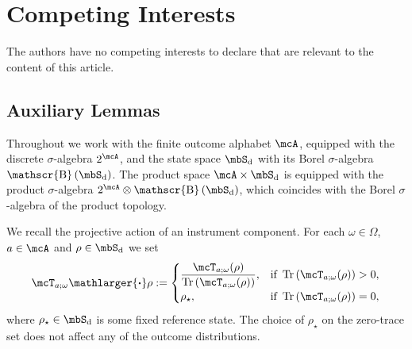 \documentclass[a4paper]{article}
\numberwithin{equation}{section}   %
\theoremstyle{plain}   %
\theoremstyle{plain}   %
\theoremstyle{examplestyle}
\DeclareMathOperator{\states}{\mbS_d}   %
\DeclareMathOperator{\dummyborel}{\mathscr{B}}                  %
\newcommand\borel[1]{\dummyborel\left(#1\right)}    %
\renewcommand{\tr}[1]{\operatorname{Tr}\left(#1\right)} %
\newcommand{\proj}{{\mathlarger{\boldsymbol{\cdot}}}} %
\begin{document}
\section*{Competing Interests}
\noindent
The authors have no competing interests to declare that are relevant to the content of this article. 
\begin{appendix}


\section{Auxiliary Lemmas}
\label{section:appn}


    Throughout we work with the finite outcome alphabet $\mcA$, equipped with the discrete $\sigma$-algebra $2^\mcA$, and the state space $\states$ with its Borel $\sigma$-algebra $\borel{\states}$.
    The product space $\mcA\times\states$ is equipped with the product $\sigma$-algebra $2^\mcA\otimes\borel{\states}$, which coincides with the Borel $\sigma$-algebra of the product topology.

    We recall the projective action of an instrument component.
    For each $\omega\in\Omega$, $a\in\mcA$ and $\rho\in\states$ we set
    \begin{equation}
    \label{eq:appendix-projective-action}
        \mcT_{a;\omega}\proj\rho
        :=
        \begin{cases}
            \dfrac{\mcT_{a;\omega}(\rho)}{\tr{\mcT_{a;\omega}(\rho)}}, 
                & \text{if }\tr{\mcT_{a;\omega}(\rho)}>0,\\[1ex]
            \rho_\star, 
                & \text{if }\tr{\mcT_{a;\omega}(\rho)}=0,
        \end{cases}
    \end{equation}
    where $\rho_\star\in\states$ is some fixed reference state.
    The choice of $\rho_\star$ on the zero-trace set does not affect any of the outcome distributions.


\end{appendix}
\end{document}
